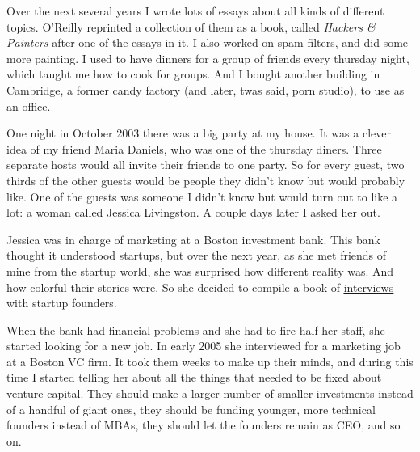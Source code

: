 Over the next
                  several years I wrote lots of essays about all kinds of
                  different topics. O'Reilly reprinted a collection of them as a
                  book, called \emph{Hackers \& Painters} after one of the essays
                  in it. I also worked on spam filters, and did some more
                  painting. I used to have dinners for a group of friends every
                  thursday night, which taught me how to cook for groups. And I
                  bought another building in Cambridge, a former candy factory
                  (and later, twas said, porn studio), to use as an office.

One
                  night in October 2003 there was a big party at my house. It
                  was a clever idea of my friend Maria Daniels, who was one of
                  the thursday diners. Three separate hosts would all invite
                  their friends to one party. So for every guest, two thirds of
                  the other guests would be people they didn't know but would
                  probably like. One of the guests was someone I didn't know but
                  would turn out to like a lot: a woman called Jessica
                  Livingston. A couple days later I asked her out.

Jessica
                  was in charge of marketing at a Boston investment bank. This
                  bank thought it understood startups, but over the next year,
                  as she met friends of mine from the startup world, she was
                  surprised how different reality was. And how colorful their
                  stories were. So she decided to compile a book of
                  \href{https://www.amazon.com/Founders-Work-Stories-Startups-Early/dp/1430210788}{\underline{interviews}}
                  with startup founders.

When the bank had financial
                  problems and she had to fire half her staff, she started
                  looking for a new job. In early 2005 she interviewed for a
                  marketing job at a Boston VC firm. It took them weeks to make
                  up their minds, and during this time I started telling her
                  about all the things that needed to be fixed about venture
                  capital. They should make a larger number of smaller
                  investments instead of a handful of giant ones, they should be
                  funding younger, more technical founders instead of MBAs, they
                  should let the founders remain as CEO, and so on.

